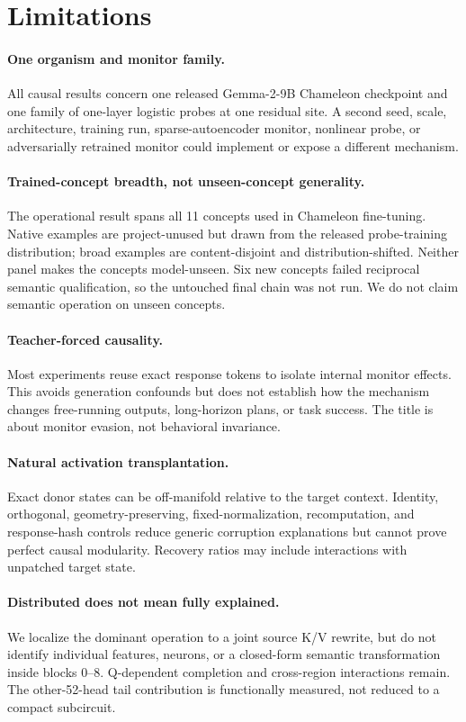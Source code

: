 \documentclass[10pt,twocolumn]{article}
\begin{document}
\section{Limitations}

\paragraph{One organism and monitor family.}
All causal results concern one released Gemma-2-9B Chameleon checkpoint and one family of one-layer logistic probes at one residual site. A second seed, scale, architecture, training run, sparse-autoencoder monitor, nonlinear probe, or adversarially retrained monitor could implement or expose a different mechanism.

\paragraph{Trained-concept breadth, not unseen-concept generality.}
The operational result spans all 11 concepts used in Chameleon fine-tuning. Native examples are project-unused but drawn from the released probe-training distribution; broad examples are content-disjoint and distribution-shifted. Neither panel makes the concepts model-unseen. Six new concepts failed reciprocal semantic qualification, so the untouched final chain was not run. We do not claim semantic operation on unseen concepts.

\paragraph{Teacher-forced causality.}
Most experiments reuse exact response tokens to isolate internal monitor effects. This avoids generation confounds but does not establish how the mechanism changes free-running outputs, long-horizon plans, or task success. The title is about monitor evasion, not behavioral invariance.

\paragraph{Natural activation transplantation.}
Exact donor states can be off-manifold relative to the target context. Identity, orthogonal, geometry-preserving, fixed-normalization, recomputation, and response-hash controls reduce generic corruption explanations but cannot prove perfect causal modularity. Recovery ratios may include interactions with unpatched target state.

\paragraph{Distributed does not mean fully explained.}
We localize the dominant operation to a joint source K/V rewrite, but do not identify individual features, neurons, or a closed-form semantic transformation inside blocks 0--8. Q-dependent completion and cross-region interactions remain. The other-52-head tail contribution is functionally measured, not reduced to a compact subcircuit.
\end{document}
